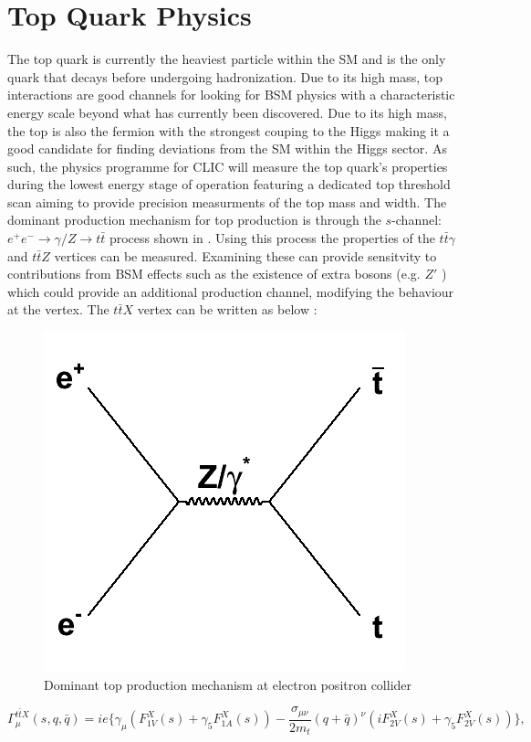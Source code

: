 \section{Top Quark Physics}


The top quark is currently the heaviest particle within the \ac{SM} and is the only quark that decays before undergoing hadronization. Due to its high mass, top interactions are good channels for looking for \ac{BSM} physics with a characteristic energy scale beyond what has currently been discovered. Due to its high mass, the top is also the fermion with the strongest couping to the Higgs making it a good candidate for finding deviations from the \ac{SM} within the Higgs sector. As such, the physics programme for \ac{CLIC} will measure the top quark's properties during the lowest energy stage of operation featuring a dedicated top threshold scan aiming to provide precision measurments of the top mass and width. The dominant production mechanism for top production is through the $s$-channel: $e^+e^-\rightarrow\gamma /Z\rightarrow t\bar{t}$ process shown in . Using this process the properties of the $t\bar{t}\gamma$ and $t\bar{t}Z$ vertices can be measured. Examining these can provide sensitvity to contributions from \ac{BSM} effects such as the existence of extra bosons (e.g. $Z'$ \cite{Langacker:2008yv}) which could provide an additional production channel, modifying the behaviour at the vertex. The  $t\bar{t}X$ vertex can be written as below \cite{Amjad:2015mma}:

\begin{figure}
\centering
\includegraphics[width=0.35\linewidth]{Theory/fig/ttFeynmann}
\caption[Dominant top production mechanism at electron positron colliders]{Dominant top production mechanism at electron positron collider}
\label{fig:topFeynmann}
\end{figure}

\begin{equation}
\Gamma_{\mu}^{t\bar{t}X}(s,q,\bar{q})= ie\{ \gamma_{\mu}(F_{1V}^{X}(s)+ \gamma_{5}F_{1A}^{X}(s)) - \frac{\sigma_{\mu\nu}}{2m_t}(q+\bar{q})^{\nu}(iF_{2V}^{X}(s) + \gamma_{5}F_{2V}^{X}(s))\},
\end{equation}

